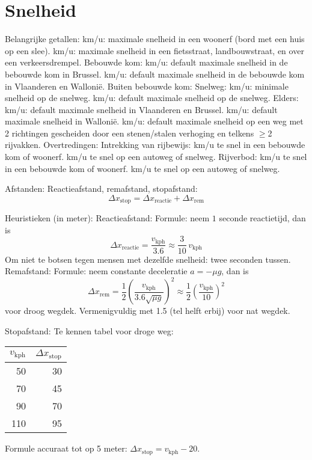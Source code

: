 \section{Snelheid}
\begin{outline}
\1 Belangrijke getallen:
	 km/u: maximale snelheid in een woonerf (bord met een huis op een slee).
	 km/u: maximale snelheid in een fietsstraat, landbouwstraat, en over een verkeersdrempel.
	\2 Bebouwde kom:
		 km/u: default maximale snelheid in de bebouwde kom in Brussel.
		 km/u: default maximale snelheid in de bebouwde kom in Vlaanderen en Wallonië.
	\2 Buiten bebouwde kom:
		\3 Snelweg:
			 km/u: minimale snelheid op de snelweg.
			 km/u: default maximale snelheid op de snelweg.
		\3 Elders:
			 km/u: default maximale snelheid in Vlaanderen en Brussel.
			 km/u: default maximale snelheid in Wallonië.
			 km/u: default maximale snelheid op een weg met 2 richtingen gescheiden door een stenen/stalen verhoging en telkens $\geq$2 rijvakken.
	\2 Overtredingen:
		\3 Intrekking van rijbewijs:
			 km/u te snel in een bebouwde kom of woonerf.
			 km/u te snel op een autoweg of snelweg.
		\3 Rijverbod:
			 km/u te snel in een bebouwde kom of woonerf.
			 km/u te snel op een autoweg of snelweg.

\1 Afstanden:
	\2 Reactieafstand, remafstand, stopafstand:
	\begin{equation}
		\Delta x_\textrm{stop} = \Delta x_\textrm{reactie} + \Delta x_\textrm{rem}
	\end{equation}
	
	\2 Heuristieken (in meter):
		\3 Reactieafstand:
			\4 Formule: neem $1$ seconde reactietijd, dan is
			\begin{equation}
				\Delta x_\textrm{reactie} = \frac{v_\textrm{kph}}{3.6} \approx \frac{3}{10}\, v_\textrm{kph}
			\end{equation}
			\4 Om niet te botsen tegen mensen met dezelfde snelheid: twee seconden tussen.
		\3 Remafstand:
			\4 Formule: neem constante deceleratie $a = -\mu g$, dan is
			\begin{equation}
				\Delta x_\textrm{rem} = \frac{1}{2} \left( \frac{v_\textrm{kph}}{3.6 \sqrt{\mu g}} \right)^{\!2} \approx \frac{1}{2} \left( \frac{v_\textrm{kph}}{10} \right)^{\!2}
			\end{equation}
			voor droog wegdek. Vermenigvuldig met 1.5 (tel helft erbij) voor nat wegdek.

		\2 Stopafstand:
			\3 Te kennen tabel voor droge weg:
			\begin{center}
			\begin{tabular}{rr}
				$v_\textrm{kph}$ & $\Delta x_\textrm{stop}$ \\\hline
				50 & 30 \\
				70 & 45 \\
				90 & 70 \\
				110 & 95 \\
			\end{tabular}
			\end{center}
			
			\3 Formule accuraat tot op 5 meter: $\Delta x_\textrm{stop} = v_\textrm{kph} - 20$.
\end{outline}

